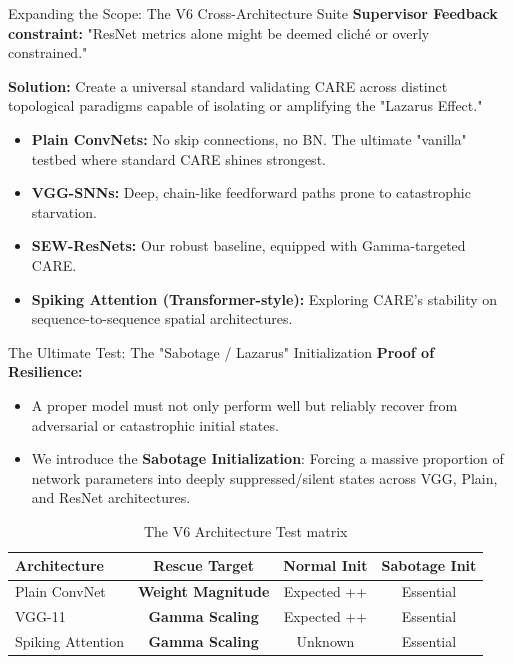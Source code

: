 \documentclass[aspectratio=169]{beamer}
\begin{document}
\begin{frame}{Expanding the Scope: The V6 Cross-Architecture Suite}
    \textbf{Supervisor Feedback constraint:} "ResNet metrics alone might be deemed cliché or overly constrained." 
    
    \vspace{0.2cm}
    \textbf{Solution:} Create a universal standard validating CARE across distinct topological paradigms capable of isolating or amplifying the "Lazarus Effect."
    
    \begin{itemize}
        \item \textbf{Plain ConvNets:} No skip connections, no BN. The ultimate "vanilla" testbed where standard CARE shines strongest.
        \item \textbf{VGG-SNNs:} Deep, chain-like feedforward paths prone to catastrophic starvation.
        \item \textbf{SEW-ResNets:} Our robust baseline, equipped with Gamma-targeted CARE.
        \item \textbf{Spiking Attention (Transformer-style):} Exploring CARE's stability on sequence-to-sequence spatial architectures. 
    \end{itemize}
\end{frame}

\begin{frame}{The Ultimate Test: The "Sabotage / Lazarus" Initialization}
    \textbf{Proof of Resilience:}
    \begin{itemize}
        \item A proper model must not only perform well but reliably recover from adversarial or catastrophic initial states.
        \item We introduce the \textbf{Sabotage Initialization}: Forcing a massive proportion of network parameters into deeply suppressed/silent states across VGG, Plain, and ResNet architectures.
    \end{itemize}
    
    \vspace{0.3cm}
    \begin{table}[]
        \centering
        \begin{tabular}{lccc}
            \toprule
            Architecture & Rescue Target & Normal Init & Sabotage Init \\
            \midrule
            Plain ConvNet & \textbf{Weight Magnitude} & Expected ++ & Essential \\
            VGG-11 & \textbf{Gamma Scaling} & Expected ++ & Essential \\
            Spiking Attention & \textbf{Gamma Scaling} & Unknown & Essential \\
            \bottomrule
        \end{tabular}
        \caption{The V6 Architecture Test matrix}
    \end{table}

\end{frame}
\end{document}

